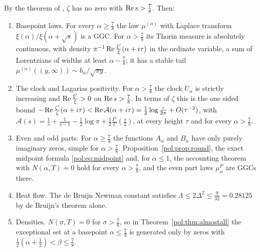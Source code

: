 \begin{theorem}\label{pol:thm:qrh}
By the theorem of \cite{OAI26a}, $\zeta$ has no zero with $\operatorname{Re} s>\frac78$. Then:
\begin{enumerate}
\item[(i)] Basepoint laws. For every $\alpha\ge\frac78$ the law $\mu^{(\alpha)}$ with Laplace transform $\xi(\alpha)/\xi(\alpha+\sqrt s)$ is a GGC. For $\alpha>\frac78$ its Thorin measure is absolutely continuous, with density $\pi^{-1}\operatorname{Re}\frac{\xi'}{\xi}(\alpha+i\tau)$ in the ordinate variable, a sum of Lorentzians of widths at least $\alpha-\frac78$; it has a stable tail $\mu^{(\alpha)}((y,\infty))\sim b_\alpha/\sqrt{\pi y}$.
\item[(ii)] The clock and Lagarias positivity. For $\alpha>\frac78$ the clock $U_\alpha$ is strictly increasing and $\operatorname{Re}\frac{\xi'}{\xi}>0$ on $\operatorname{Re} s>\frac78$. In terms of $\zeta$ this is the one sided bound $-\operatorname{Re}\frac{\zeta'}{\zeta}(\alpha+i\tau)<\operatorname{Re}\mathcal A(\alpha+i\tau)=\frac12\log\frac{\tau}{2\pi}+O(\tau^{-2})$, with $\mathcal A(s)=\frac1s+\frac1{s-1}-\frac12\log\pi+\frac12\frac{\Gamma'}{\Gamma}(\frac s2)$, at every height $\tau$ and for every $\alpha>\frac78$.
\item[(iii)] Even and odd parts. For $\alpha\ge\frac78$ the functions $A_\alpha$ and $B_\alpha$ have only purely imaginary zeros, simple for $\alpha>\frac78$. Proposition~\ref{pol:prop:round}, the exact midpoint formula \eqref{pol:eq:midpoint} and, for $\alpha\le1$, the accounting theorem with $N(\alpha,T)=0$ hold for every $\alpha>\frac78$, and the even part laws $\mu^P_\alpha$ are GGCs there.
\item[(iv)] Heat flow. The de Bruijn Newman constant satisfies $\Lambda\le2\Delta^2\le\frac{9}{32}=0.28125$ by de Bruijn's theorem alone.
\item[(v)] Densities. $N(\sigma,T)=0$ for $\sigma>\frac78$, so in Theorem~\ref{pol:thm:almostall} the exceptional set at a basepoint $\alpha\le\frac78$ is generated only by zeros with $\frac12(\alpha+\frac12)<\beta\le\frac78$.
\end{enumerate}
\end{theorem}

